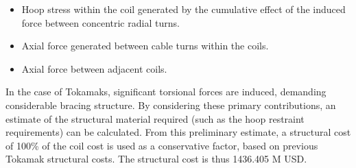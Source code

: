 \begin{itemize}
    \item Hoop stress within the coil generated by the cumulative effect of the induced force between concentric radial turns.
    \item Axial force generated between cable turns within the coils. 
    \item Axial force between adjacent coils.
\end{itemize}


In the case of Tokamaks, significant torsional forces are induced, demanding considerable bracing structure. By considering these primary contributions, an estimate of the structural material required (such as the hoop restraint requirements) can be calculated. From this preliminary estimate, a structural cost of 100\% of the coil cost is used as a conservative factor, based on previous Tokamak structural costs. The structural cost is thus 1436.405 M USD.


